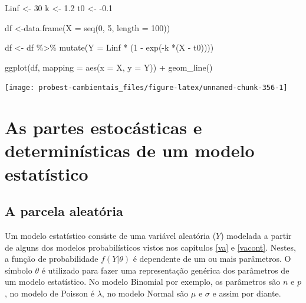 \documentclass[
]{book}
\newenvironment{Shaded}{\begin{snugshade}}{\end{snugshade}}
\newcommand{\AttributeTok}[1]{\textcolor[rgb]{0.77,0.63,0.00}{#1}}
\newcommand{\DecValTok}[1]{\textcolor[rgb]{0.00,0.00,0.81}{#1}}
\newcommand{\FloatTok}[1]{\textcolor[rgb]{0.00,0.00,0.81}{#1}}
\newcommand{\FunctionTok}[1]{\textcolor[rgb]{0.00,0.00,0.00}{#1}}
\newcommand{\NormalTok}[1]{#1}
\newcommand{\OtherTok}[1]{\textcolor[rgb]{0.56,0.35,0.01}{#1}}
\newcommand{\SpecialCharTok}[1]{\textcolor[rgb]{0.00,0.00,0.00}{#1}}
\begin{document}
\begin{Shaded}
\begin{Highlighting}[]
\NormalTok{Linf }\OtherTok{\textless{}{-}} \DecValTok{30}
\NormalTok{k }\OtherTok{\textless{}{-}} \FloatTok{1.2}
\NormalTok{t0 }\OtherTok{\textless{}{-}} \SpecialCharTok{{-}}\FloatTok{0.1}

\NormalTok{df }\OtherTok{\textless{}{-}}\FunctionTok{data.frame}\NormalTok{(}\AttributeTok{X =} \FunctionTok{seq}\NormalTok{(}\DecValTok{0}\NormalTok{, }\DecValTok{5}\NormalTok{, }\AttributeTok{length =} \DecValTok{100}\NormalTok{))}

\NormalTok{df }\OtherTok{\textless{}{-}}\NormalTok{ df }\SpecialCharTok{\%\textgreater{}\%} \FunctionTok{mutate}\NormalTok{(}\AttributeTok{Y =}\NormalTok{ Linf }\SpecialCharTok{*}\NormalTok{ (}\DecValTok{1} \SpecialCharTok{{-}} \FunctionTok{exp}\NormalTok{(}\SpecialCharTok{{-}}\NormalTok{k }\SpecialCharTok{*}\NormalTok{(X }\SpecialCharTok{{-}}\NormalTok{ t0))))}

\FunctionTok{ggplot}\NormalTok{(df, }\AttributeTok{mapping =} \FunctionTok{aes}\NormalTok{(}\AttributeTok{x =}\NormalTok{ X, }\AttributeTok{y =}\NormalTok{ Y)) }\SpecialCharTok{+}
  \FunctionTok{geom\_line}\NormalTok{()}
\end{Highlighting}
\end{Shaded}

\begin{center}\texttt{[image: probest-cambientais\_files/figure-latex/unnamed-chunk-356-1]} \end{center}

\hypertarget{modelstat}{%
\chapter{As partes estocásticas e determinísticas de um modelo estatístico}\label{modelstat}}

\hypertarget{a-parcela-aleatuxf3ria}{%
\section{A parcela aleatória}\label{a-parcela-aleatuxf3ria}}

Um modelo estatístico consiste de uma variável aleatória (\(Y\)) modelada a partir de alguns dos modelos probabilísticos vistos nos capítulos \ref{va} e \ref{vacont}. Nestes, a função de probabilidade \(f(Y|\theta)\) é dependente de um ou mais parâmetros. O símbolo \(\theta\) é utilizado para fazer uma representação genérica dos parâmetros de um modelo estatístico. No modelo Binomial por exemplo, os parâmetros são \(n\) e \(p\), no modelo de Poisson é \(\lambda\), no modelo Normal são \(\mu\) e \(\sigma\) e assim por diante.
\end{document}
